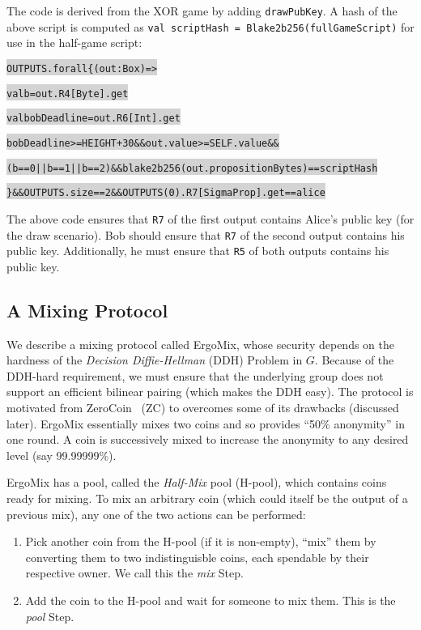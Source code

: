 \documentclass[11pt]{article}
\newcommand\Hi[2][lightgray]{%
	\hspace*{-\fboxsep}%
	\colorbox{#1}{#2}%
	\hspace*{-\fboxsep}%
}
\newcommand{\mixname}{ErgoMix\xspace}
\begin{document}
The code is derived from the XOR game by adding \texttt{drawPubKey}. A hash of the above script is computed as \texttt{val scriptHash = Blake2b256(fullGameScript)} for use in the half-game script:

\begin{alltt}
\Hi{OUTPUTS.forall\{(out:Box) =>}
  \Hi{val b             = out.R4[Byte].get}
  \Hi{val bobDeadline   = out.R6[Int].get}

  \Hi{bobDeadline >= HEIGHT+30 && out.value >= SELF.value &&}
  \Hi{(b == 0 || b == 1 || b == 2) && blake2b256(out.propositionBytes) == scriptHash}
\Hi{\} && OUTPUTS.size == 2 && OUTPUTS(0).R7[SigmaProp].get == alice }
\end{alltt}


The above code ensures that \texttt{R7} of the first output contains Alice's public key (for the draw scenario). Bob should ensure that \texttt{R7} of the second output contains his public key. Additionally, he must ensure that \texttt{R5} of both outputs contains his public key.

\subsection{A Mixing Protocol}
\label{mix}

We describe a mixing protocol called \mixname, whose security depends on the hardness of the {\em Decision Diffie-Hellman} (DDH) Problem in $G$. Because of the DDH-hard requirement, we must ensure that the underlying group does not support an efficient bilinear pairing (which makes the DDH easy). The protocol is motivated from ZeroCoin~\cite{zerocoin} (ZC) to overcomes some of its drawbacks (discussed later). 
\mixname essentially mixes two coins and so provides ``50\% anonymity'' in one round. A coin is successively mixed to increase the anonymity to any desired level (say 99.99999\%). 

\mixname has a pool, called the {\em Half-Mix} pool (H-pool), which contains coins ready for mixing. 
To mix an arbitrary coin (which could itself be the output of a previous mix), any one of the two actions can be performed:
\begin{enumerate}
	\item Pick another coin from the H-pool (if it is non-empty), ``mix'' them by converting them to two indistinguisble coins, each spendable by their respective owner. We call this the {\em mix} Step.
	\item Add the coin to the H-pool and wait for someone to mix them. This is the {\em pool} Step.
\end{enumerate}
\end{document}
